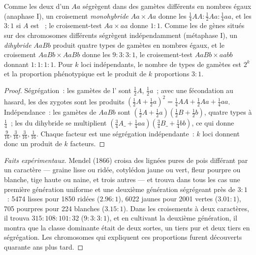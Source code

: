 \begin{theorem}\label{thm:b2:meiosis-heredity:mendel}
Comme les deux  d'un  $Aa$ ségrègent dans des
gamètes différents en nombres égaux (anaphase I), un croisement
\emph{monohybride} $Aa \times Aa$ donne les  $\tfrac14 AA : \tfrac12 Aa :
\tfrac14 aa$, et les  $3 : 1$ si $A$ est ~; le
croisement-test
$Aa \times aa$ donne $1 : 1$. Comme les  de gènes situés sur des
chromosomes différents ségrègent indépendamment (métaphase I), un
\emph{dihybride}
$AaBb$ produit quatre types de gamètes en nombres égaux, et le croisement
$AaBb \times AaBb$ donne les  $9 : 3 : 3 : 1$, le
croisement-test
$AaBb \times aabb$ donnant $1 : 1 : 1 : 1$. Pour $k$ loci 
indépendants, le nombre de types de gamètes est $2^k$ et la proportion
phénotypique est le produit de $k$ proportions $3 : 1$.
\end{theorem}
\begin{proof}
Ségrégation~: les gamètes de l' sont $\tfrac12 A$,
$\tfrac12 a$~; avec une fécondation au hasard, les  des
zygotes sont les produits $(\tfrac12 A + \tfrac12 a)^2 = \tfrac14 AA + \tfrac12 Aa +
\tfrac14 aa$. Indépendance~: les gamètes de $AaBb$ sont $(\tfrac12 A
+ \tfrac12 a)(\tfrac12 B + \tfrac12 b)$, quatre types à $\tfrac14$~;
les  du dihybride se multiplient $(\tfrac34 A\_ + \tfrac14 aa)
(\tfrac34 B\_ + \tfrac14 bb)$, ce qui donne $\tfrac{9}{16}, \tfrac{3}{16},
\tfrac{3}{16}, \tfrac{1}{16}$. Chaque facteur est une ségrégation
indépendante~: $k$ loci donnent donc un produit de $k$ facteurs.
\end{proof}
\begin{proof}[Faits expérimentaux]
Mendel (1866) croisa des lignées pures de pois différant par un
caractère --- graine lisse ou ridée, cotylédon jaune ou vert, fleur
pourpre ou blanche, tige haute ou naine, et trois autres --- et trouva
dans tous les cas une première génération uniforme et une deuxième
génération ségrégeant près de $3 : 1$~: 5474 lisses pour 1850 ridées
($2.96 :
1$), 6022 jaunes pour 2001 vertes ($3.01 : 1$), 705 pourpres pour 224
blanches
($3.15 : 1$). Dans les croisements à deux caractères, il trouva $315 : 108 : 101 :
32$ ($9 : 3 : 3 : 1$), et en cultivant la deuxième génération, il
montra que la classe dominante était de deux sortes, un tiers pur et
deux tiers en ségrégation. Les chromosomes qui expliquent ces
proportions furent découverts quarante ans plus tard.
\end{proof}


